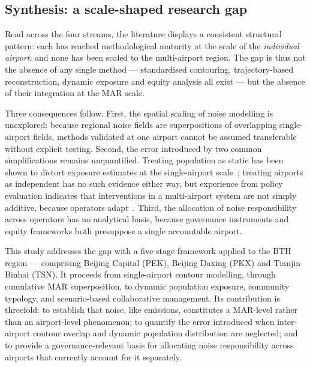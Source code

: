 \documentclass[review,12pt]{elsarticle}
\begin{document}
\subsection{Synthesis: a scale-shaped research gap}
\label{sec:lr-gap}

Read across the four streams, the literature displays a consistent structural
pattern: each has reached methodological maturity at the scale of the
\emph{individual airport}, and none has been scaled to the multi-airport region.
The gap is thus not the absence of any single method --- standardised contouring,
trajectory-based reconstruction, dynamic exposure and equity analysis all exist
--- but the absence of their integration at the MAR scale.

Three consequences follow. First, the spatial scaling of noise modelling is
unexplored: because regional noise fields are superpositions of overlapping
single-airport fields, methods validated at one airport cannot be assumed
transferable without explicit testing. Second, the error introduced by two
common simplifications remains unquantified. Treating population as static has
been shown to distort exposure estimates at the single-airport
scale~\citep{zhu2025dynamic}; treating airports as independent has no such
evidence either way, but experience from policy evaluation indicates that
interventions in a multi-airport system are not simply additive, because
operators adapt~\citep{suau2025does}. Third, the allocation of noise
responsibility across operators has no analytical basis, because governance
instruments and equity frameworks both presuppose a single accountable airport.

This study addresses the gap with a five-stage framework applied to the BTH
region --- comprising Beijing Capital (PEK), Beijing Daxing (PKX) and Tianjin
Binhai (TSN). It proceeds from single-airport contour modelling, through
cumulative MAR superposition, to dynamic population exposure, community
typology, and scenario-based collaborative management. Its contribution is
threefold: to establish that noise, like emissions, constitutes a MAR-level
rather than an airport-level phenomenon; to quantify the error introduced when
inter-airport contour overlap and dynamic population distribution are neglected;
and to provide a governance-relevant basis for allocating noise responsibility
across airports that currently account for it separately.


\end{document}

